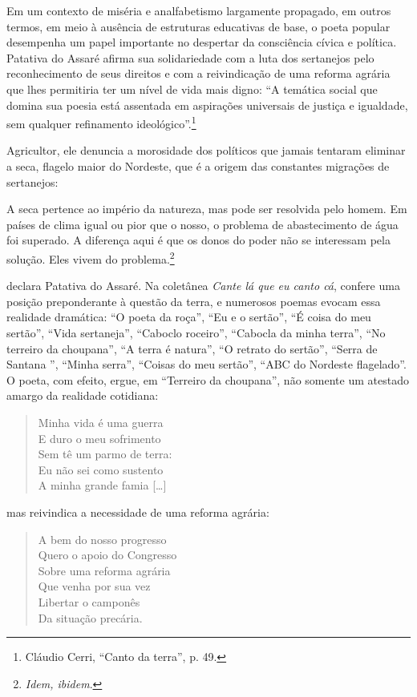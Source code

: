 \noindent Em um contexto de miséria e analfabetismo largamente propagado, em outros termos, em
meio à ausência de estruturas educativas de base, o poeta popular desempenha um
papel importante no despertar da consciência cívica e política. Patativa do
Assaré afirma sua solidariedade com a luta dos sertanejos pelo reconhecimento de
seus direitos e com a reivindicação de uma reforma agrária que lhes permitiria
ter um nível de vida mais digno: “A temática social que domina sua poesia está
assentada em aspirações universais de justiça e igualdade, sem qualquer
refinamento ideológico”.\footnote{ Cláudio Cerri, “Canto da terra”, p. 49.}

Agricultor, ele denuncia a morosidade dos políticos que jamais tentaram eliminar
a seca, flagelo maior do Nordeste, que é a origem das constantes migrações de
sertanejos:

\begin{hedraquote}
A seca pertence ao império da natureza, mas pode ser resolvida pelo
homem. Em países de clima igual ou pior que o nosso, o problema de abastecimento
de água foi superado. A diferença aqui é que os donos do poder não se interessam
pela solução. Eles vivem do problema.\footnote{ \textit{Idem, ibidem}.}
\end{hedraquote}

\noindent declara Patativa do Assaré. Na coletânea \textit{Cante lá que eu canto cá}, confere uma posição
preponderante à questão da terra, e numerosos poemas evocam essa realidade
dramática: “O poeta da roça”, “Eu e o sertão”, “É coisa do meu sertão”, “Vida
sertaneja”, “Caboclo roceiro”, “Cabocla da minha terra”, “No terreiro da
choupana”, “A terra é natura”, “O retrato do sertão”, “Serra de Santana ”,
“Minha serra”, “Coisas do meu sertão”, “ABC do Nordeste flagelado”. O poeta, com
efeito, ergue, em “Terreiro da choupana”, não somente um atestado amargo da
realidade cotidiana:

\begin{verse}
Minha vida é uma guerra\\
E duro o meu sofrimento\\
Sem tê um parmo de terra:\\
Eu não sei como sustento\\
A minha grande famia [\ldots{}]
\end{verse}

\noindent mas reivindica a necessidade de uma reforma agrária:

\begin{verse}
A bem do nosso progresso\\
Quero o apoio do Congresso\\
Sobre uma reforma agrária\\
Que venha por sua vez\\
Libertar o camponês\\
Da situação precária.
\end{verse}



